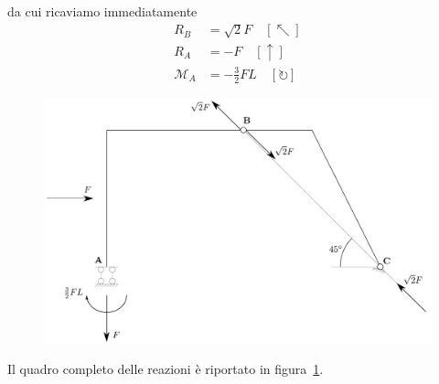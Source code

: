 da cui ricaviamo immediatamente 
\begin{align*}
R_B                    &= \sqrt{2}F        \quad [\nwarrow]   \\
R_A                    &= -F                  \quad [\uparrow]    \\
\mathcal{M}_{A} &= -\frac{3}{2}FL \quad [\circlearrowright]
\end{align*}
\renewcommand{\thefigure}{8.2~-~3}
\begin{figure}[ht]
\centering
\includegraphics[width=\textwidth]{Immagini/Parte_8/Esercizio8_2/Esercizio8_2_3.pdf}
\caption{}
\label{Esercizio8-2-3}
\end{figure}
Il quadro completo delle reazioni è riportato in figura~\ref{Esercizio8-2-3}.
\clearpage
